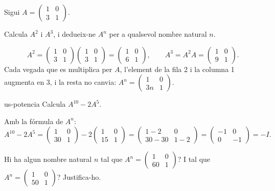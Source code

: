 Sigui $A=\begin{pmatrix}1&0\\3&1\end{pmatrix}$.

\begin{apartats}

Calcula $A^2$ i $A^3$, i dedueix-ne $A^n$ per a qualsevol nombre natural $n$.

\begin{solucio}
\[
A^2=\begin{pmatrix}1&0\\3&1\end{pmatrix}\begin{pmatrix}1&0\\3&1\end{pmatrix}=\begin{pmatrix}1&0\\6&1\end{pmatrix},\qquad
A^3=A^2A=\begin{pmatrix}1&0\\9&1\end{pmatrix}.
\]
Cada vegada que es multiplica per $A$, l'element de la fila 2 i la columna 1 augmenta en 3, i la resta no
canvia: $A^n=\begin{pmatrix}1&0\\3n&1\end{pmatrix}$.
\end{solucio}

\begin{tria}{us-potencia}
Calcula $A^{10}-2A^5$.

\begin{solucio}
Amb la fórmula de $A^n$:
\[
A^{10}-2A^5=\begin{pmatrix}1&0\\30&1\end{pmatrix}-2\begin{pmatrix}1&0\\15&1\end{pmatrix}
=\begin{pmatrix}1-2&0\\30-30&1-2\end{pmatrix}=\begin{pmatrix}-1&0\\0&-1\end{pmatrix}=-I.
\]
\end{solucio}

Hi ha algun nombre natural $n$ tal que $A^n=\begin{pmatrix}1&0\\60&1\end{pmatrix}$? I tal que
$A^n=\begin{pmatrix}1&0\\50&1\end{pmatrix}$? Justifica-ho.


\end{tria}
\end{apartats}
